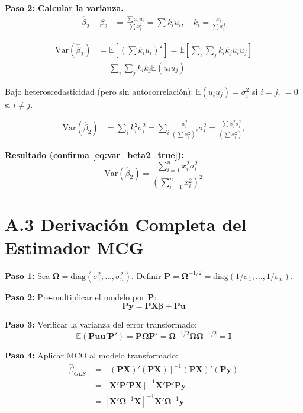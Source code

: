 \documentclass[12pt,a4paper]{report}
\theoremstyle{definition}
\theoremstyle{remark}
\newcommand{\E}{\mathbb{E}}
\newcommand{\Var}{\mathrm{Var}}
\newcommand{\betahat}{\hat{\beta}}
\begin{document}
\textbf{Paso 2: Calcular la varianza.}
\begin{align*}
  \betahat_2 - \beta_2 &= \frac{\sum x_i u_i}{\sum x_i^2} = \sum k_i u_i, \quad k_i = \frac{x_i}{\sum x_i^2}
\end{align*}

\begin{align*}
  \Var(\betahat_2) &= \E\left[\left(\sum k_i u_i\right)^2\right] = \E\left[\sum_i \sum_j k_i k_j u_i u_j\right]\\
  &= \sum_i \sum_j k_i k_j \E(u_i u_j)
\end{align*}

Bajo heteroscedasticidad (pero sin autocorrelación): $\E(u_i u_j) = \sigma_i^2$ si $i = j$, $= 0$ si $i \neq j$.

\begin{align*}
  \Var(\betahat_2) &= \sum_i k_i^2 \sigma_i^2 = \sum_i \frac{x_i^2}{(\sum x_i^2)^2} \sigma_i^2 = \frac{\sum x_i^2 \sigma_i^2}{(\sum x_i^2)^2}
\end{align*}

\textbf{Resultado (confirma \eqref{eq:var_beta2_true}):}
\begin{equation}
  \Var(\betahat_2) = \frac{\sum_{i=1}^n x_i^2 \sigma_i^2}{\left(\sum_{i=1}^n x_i^2\right)^2}
  \tag{A.1}
\end{equation}

\section*{A.3 Derivación Completa del Estimador MCG}

\textbf{Paso 1:} Sea $\boldsymbol{\Omega} = \text{diag}(\sigma_1^2, \ldots, \sigma_n^2)$. Definir $\mathbf{P} = \boldsymbol{\Omega}^{-1/2} = \text{diag}(1/\sigma_1, \ldots, 1/\sigma_n)$.

\textbf{Paso 2:} Pre-multiplicar el modelo por $\mathbf{P}$:
\begin{equation*}
  \mathbf{P}\mathbf{y} = \mathbf{P}\mathbf{X}\boldsymbol{\beta} + \mathbf{P}\mathbf{u}
\end{equation*}

\textbf{Paso 3:} Verificar la varianza del error transformado:
\begin{equation*}
  \E(\mathbf{P}\mathbf{u}\mathbf{u}'\mathbf{P}') = \mathbf{P}\boldsymbol{\Omega}\mathbf{P}' = \boldsymbol{\Omega}^{-1/2}\boldsymbol{\Omega}\boldsymbol{\Omega}^{-1/2} = \mathbf{I}
\end{equation*}

\textbf{Paso 4:} Aplicar MCO al modelo transformado:
\begin{align*}
  \betahat_{GLS} &= [(\mathbf{P}\mathbf{X})' (\mathbf{P}\mathbf{X})]^{-1} (\mathbf{P}\mathbf{X})' (\mathbf{P}\mathbf{y})\\
  &= [\mathbf{X}'\mathbf{P}'\mathbf{P}\mathbf{X}]^{-1} \mathbf{X}'\mathbf{P}'\mathbf{P}\mathbf{y}\\
  &= [\mathbf{X}'\boldsymbol{\Omega}^{-1}\mathbf{X}]^{-1} \mathbf{X}'\boldsymbol{\Omega}^{-1}\mathbf{y}
\end{align*}
\end{document}
